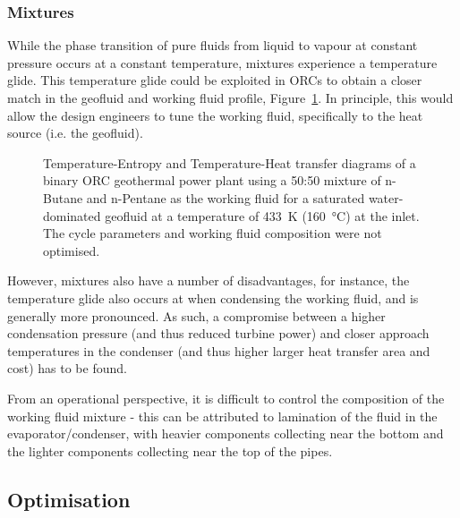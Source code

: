         \subsubsection{Mixtures}
            While the phase transition of pure fluids from liquid to vapour at constant pressure occurs at a constant temperature, mixtures experience a temperature glide. This temperature glide could be exploited in \ac{ORC}s to obtain a closer match in the geofluid and working fluid profile, Figure~\ref{fig:litrev_ORC_mixture_TS}. In principle, this would allow the design engineers to tune the working fluid, specifically to the heat source (i.e. the geofluid).
        
             \begin{figure}[H]
                \centering
                
                \caption[TS and TQ diagrams of a binary \ac{ORC} geothermal power plant using a 50:50 mixture of n-Butane and n-Pentane as the working fluid.]{Temperature-Entropy and Temperature-Heat transfer diagrams of a binary ORC geothermal power plant using a 50:50 mixture of n-Butane and n-Pentane as the working fluid for a saturated water-dominated geofluid at a temperature of \qty{433}{\K} (\qty{160}{\degreeCelsius}) at the inlet. The cycle parameters and working fluid composition were not optimised.}
                \label{fig:litrev_ORC_mixture_TS}
            \end{figure}

            However, mixtures also have a number of disadvantages, for instance, the temperature glide also occurs at when condensing the working fluid, and is generally more pronounced. As such, a compromise between a higher condensation pressure (and thus reduced turbine power) and closer approach temperatures in the condenser (and thus higher larger heat transfer area and cost) has to be found.

            From an operational perspective, it is difficult to control the composition of the working fluid mixture - this can be attributed to lamination of the fluid in the evaporator/condenser, with heavier components collecting near the bottom and the lighter components collecting near the top of the pipes.

    \subsection{Optimisation}
        \label{sec:prosim_litrev_ORC_opt}

